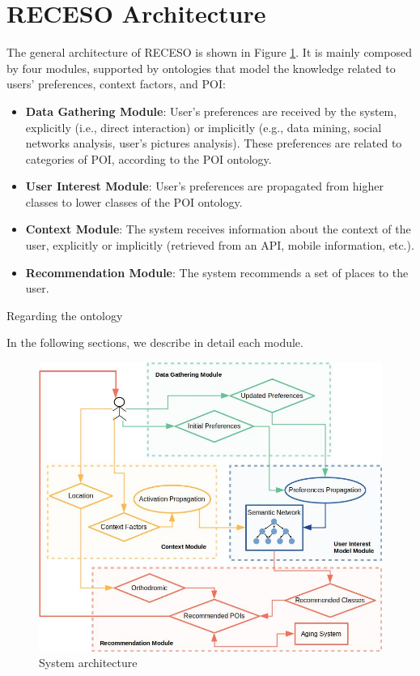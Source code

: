 \section{RECESO Architecture}
\label{sec:proposal}

The general architecture of RECESO is shown in Figure \ref{fig:arquitecture}. It is mainly composed by four modules, supported by ontologies that model the knowledge related to users' preferences, context factors, and POI:  
\begin{itemize}
    \item \textbf{Data Gathering Module}: User's preferences are received by the system, explicitly (i.e., direct interaction) or implicitly (e.g., data mining, social networks analysis, user's pictures analysis). These preferences are related to categories of POI, according to the POI ontology. 
    \item \textbf{User Interest Module}: User's preferences are propagated from higher classes to lower classes of the POI ontology.
    \item \textbf{Context Module}: The system receives information about the context of the user, explicitly or implicitly (retrieved from an API, mobile information, etc.).
    \item \textbf{Recommendation Module}: The system recommends a set of places to the user.
\end{itemize}

Regarding the ontology 

In the following sections, we describe in detail each module.


\begin{figure}[h]
\centering
\includegraphics[scale=0.4]{draws/arquitecture.jpg}
\caption{System architecture}
\label{fig:arquitecture}
\end{figure}

